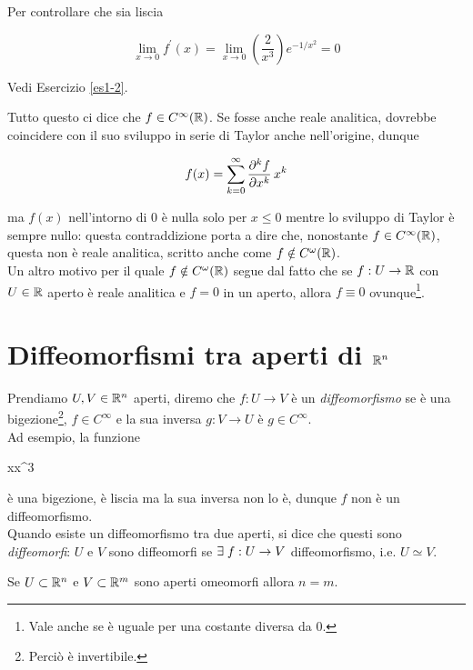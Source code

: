 Per controllare che sia liscia

\begin{equation}
	\lim_{x \to 0} f^{\prime} (x) = \lim_{x \to 0} \left(\dfrac{2}{x^{3}}\right) e^{-1/x^{2}} = 0
\end{equation}

Vedi Esercizio \ref{es1-2}.

Tutto questo ci dice che $ f \in C^{\infty}(\mathbb{R}) $. Se fosse anche reale analitica, dovrebbe coincidere con il suo sviluppo in serie di Taylor anche nell'origine, dunque

\begin{align}
	\begin{split}
		f(x) = \sum_{k=0}^{\infty} \pdv[k]{f}{x} (0) \, x^{k}
	\end{split}
\end{align}

ma $ f(x) $ nell'intorno di 0 è nulla solo per $ x \leqslant 0 $ mentre lo sviluppo di Taylor è sempre nullo: questa contraddizione porta a dire che, nonostante $ f \in C^{\infty}(\mathbb{R}) $, questa non è reale analitica, scritto anche come $ f \notin C^{\omega}(\mathbb{R}) $.\\
Un altro motivo per il quale $ f \notin C^{\omega}(\mathbb{R}) $ segue dal fatto che se $ f : U \to \mathbb{R} $ con $ U \in \mathbb{R} $ aperto è reale analitica e $ f = 0 $ in un aperto, allora $ f \equiv 0 $ ovunque\footnote{%
	Vale anche se è uguale per una costante diversa da 0.}.

\section{Diffeomorfismi tra aperti di $ \mathbb{R}^{n} $}

Prendiamo $ U, V \in \mathbb{R}^{n} $ aperti, diremo che $ f : U \to V $ è un \textit{diffeomorfismo} se è una bigezione\footnote{%
	Perciò è invertibile.%
}, $ f \in C^{\infty} $ e la sua inversa $ g : V \to U $ è  $ g \in C^{\infty} $.\\
Ad esempio, la funzione

	{\R}{\R}
	{x}{x^{3}}
	
è una bigezione, è liscia ma la sua inversa non lo è, dunque $ f $ non è un diffeomorfismo.\\
Quando esiste un diffeomorfismo tra due aperti, si dice che questi sono \textit{diffeomorfi}: $ U $ e $ V $ sono diffeomorfi se $ \exists \; f : U \to V $ diffeomorfismo, i.e. $ U \simeq V $.\\

\begin{theorem}
	Se $ U \subset \mathbb{R}^{n} $ e $ V \subset \mathbb{R}^{m} $ sono aperti omeomorfi allora $ n = m $.
\end{theorem}

